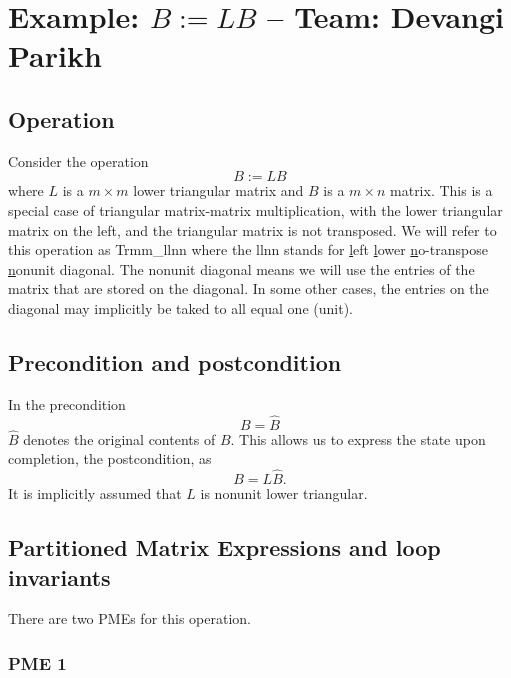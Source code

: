 \chapter{Example: $ B := L B $ --  \large Team: Devangi Parikh}



\section{Operation}

Consider the operation
\[
B := L B 
\]
where $ L $ is a $ m \times m $ lower triangular matrix and $ B $ is a $ m \times n $ matrix.
This is a special case of triangular 
matrix-matrix multiplication, 
with the {\sc l}ower triangular matrix on the {\sc l}eft, 
and the triangular matrix is {\sc n}ot transposed.
We will refer to this operation
as {\sc Trmm\_llnn} where the {\sc llnn} stands for
\underline{l}eft
\underline{l}ower
\underline{n}o-transpose
\underline{n}onunit diagonal.
The {\sc n}onunit diagonal means we will use the entries of the matrix that are stored on the diagonal.  In some other cases, the entries on the diagonal may implicitly be taked to all equal one ({\sc u}nit).

\section{Precondition and postcondition}

In the precondition 
\[
B = \widehat B
\]
$ \widehat B $ denotes the original contents of $ B $.
This allows us to express the state upon completion, the postcondition, as
\[
B = L \widehat B.
\]
It is implicitly assumed that $ L $ is nonunit lower triangular.
\section{Partitioned Matrix Expressions and loop invariants}

There are two PMEs for this operation.

\subsection{PME 1}

